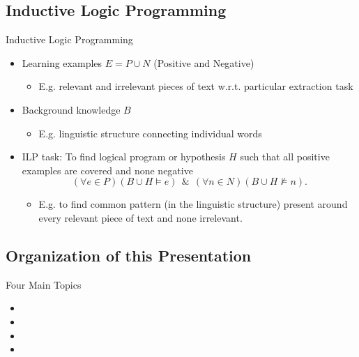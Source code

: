 \documentclass[xcolor=dvipsnames]{beamer}
\begin{document}
\subsection{Inductive Logic Programming} 

\begin{frame}{Inductive Logic Programming}
\begin{itemize}
	\item Learning examples $E=P\cup N$ (Positive and Negative)	
	\begin{itemize}
		\item E.g. relevant and irrelevant pieces of text w.r.t. particular extraction task
	\end{itemize}	
	\item Background knowledge $B$
	\begin{itemize}
		\item E.g. linguistic structure connecting individual words
	\end{itemize}	
	\item ILP task: To find logical program or hypothesis $H$ such that all positive examples are covered and none negative
$$
(\forall e\in P)(B\cup H\models e) \ \ \&\  \ (\forall n\in N)(B\cup H\not\models n).
$$
	\begin{itemize}
		\item E.g. to find common pattern (in the linguistic structure) present around every relevant piece of text and none irrelevant.
	\end{itemize}	
\end{itemize}
\end{frame}


\subsection{Organization of this Presentation} 

\begin{frame}{Four Main Topics}

\begin{itemize}
	\item {}
	\item {}
	\item {}
	\item {}
\end{itemize}

\end{frame}
\end{document}

